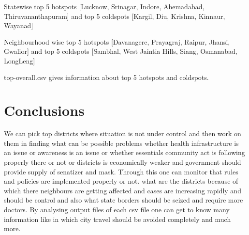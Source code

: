 \documentclass[letterpaper,12pt]{article}
\begin{document}
Statewise top 5 hotspots [Lucknow, Srinagar, Indore, Ahemadabad, Thiruvananthapuram] and top 5 coldspots [Kargil, Diu, Krishna, Kinnaur, Wayanad]

Neighbourhood wise top 5 hotspots [Davanagere, Prayagraj, Raipur, Jhansi, Gwalior] and top 5 coldspots [Sambhal, West Jaintia Hills, Siang, Osmanabad, LongLeng]

top-overall.csv gives information about top 5 hotspots and coldspots.

\section{Conclusions}
We can pick top districts where situation is not under control and then work on them in finding what can be possible problems whether health infrastructure is an issue or awareness is an issue or  whether essentials community act is following properly there or not or districts is economically weaker and government should provide supply of senatizer and mask. Through this one can monitor that rules and policies are implemented properly or not.
what are the districts because of which there neighbours are getting affected and cases are increasing rapidly and should be control and also what state borders should be seized and require more doctors. By analysing output files of each csv file one can get to know many information like in which city travel should be avoided completely and much more.
\end{document}
